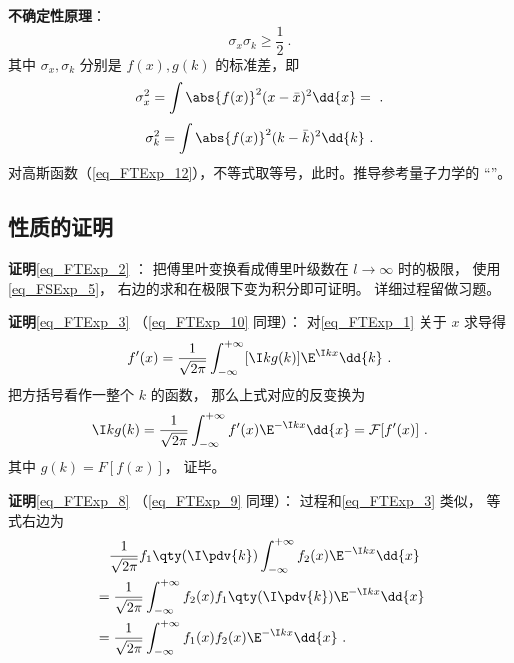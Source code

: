 \textbf{不确定性原理}：
\begin{equation}
\sigma_x \sigma_k \geqslant \frac{1}{2}~.
\end{equation}
其中 $\sigma_x, \sigma_k$ 分别是 $f(x), g(k)$ 的标准差，即
\begin{equation}
\sigma_x^2 = \int \abs{f(x)}^2 (x-\bar x)^2 \dd{x} = ~.
\end{equation}
\begin{equation}
\sigma_k^2 = \int \abs{f(x)}^2 (k-\bar k)^2 \dd{k}~.
\end{equation}
对高斯函数（\autoref{eq_FTExp_12}），不等式取等号，此时。推导参考量子力学的 “”。

\subsection{性质的证明}

\textbf{证明}\autoref{eq_FTExp_2} ： 把傅里叶变换看成傅里叶级数在 $l \to \infty$ 时的极限， 使用\autoref{eq_FSExp_5}， 右边的求和在极限下变为积分即可证明。 详细过程留做习题。

\textbf{证明}\autoref{eq_FTExp_3} （\autoref{eq_FTExp_10} 同理）： 对\autoref{eq_FTExp_1} 关于 $x$ 求导得
\begin{equation}
f'(x) = \frac{1}{\sqrt{2\pi }} \int_{-\infty }^{+\infty } [\I kg(k)]\E^{\I kx} \dd{k}~.
\end{equation}
把方括号看作一整个 $k$ 的函数， 那么上式对应的反变换为
\begin{equation}
\I kg(k) = \frac{1}{\sqrt{2\pi }} \int_{-\infty }^{+\infty } f'(x) \E^{-\I kx} \dd{x} = \mathcal F [f'(x)]~.
\end{equation}
其中 $g(k) = F [f(x)]$， 证毕。

\textbf{证明}\autoref{eq_FTExp_8} （\autoref{eq_FTExp_9} 同理）： 过程和\autoref{eq_FTExp_3} 类似， 等式右边为
\begin{equation}
\begin{aligned}
& \quad \frac{1}{\sqrt{2\pi }} f_1\qty(\I \pdv{k}) \int_{-\infty }^{+\infty } f_2(x)\E^{-\I kx} \dd{x}\\
&= \frac{1}{\sqrt{2\pi }} \int_{-\infty }^{+\infty } f_2(x) f_1\qty(\I \pdv{k})\E^{-\I kx} \dd{x}\\
&= \frac{1}{\sqrt{2\pi }} \int_{-\infty }^{+\infty } f_1(x) f_2(x) \E^{-\I kx} \dd{x}~.
\end{aligned}
\end{equation}
